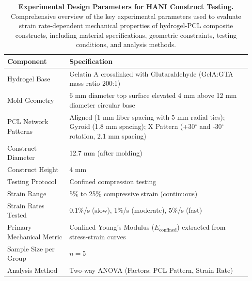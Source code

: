 \begin{table}[H]
\centering
\caption{\textbf{Experimental Design Parameters for HANI Construct Testing.} Comprehensive overview of the key experimental parameters used to evaluate strain rate-dependent mechanical properties of hydrogel-PCL composite constructs, including material specifications, geometric constraints, testing conditions, and analysis methods.}
\label{tab:test_design}
\begin{tabular}{|p{4cm}|p{10cm}|}
\hline
\textbf{Component} & \textbf{Specification} \\ \hline
Hydrogel Base & Gelatin A crosslinked with Glutaraldehyde (GelA:GTA mass ratio 200:1) \\ \hline
Mold Geometry & 6 mm diameter top surface elevated 4 mm above 12 mm diameter circular base \\ \hline
PCL Network Patterns & Aligned (1 mm fiber spacing with 5 mm radial ties); Gyroid (1.8 mm spacing); X Pattern (+30$^\circ$ and -30$^\circ$ rotation, 2.1 mm spacing) \\ \hline
Construct Diameter & 12.7 mm (after molding) \\ \hline
Construct Height & 4 mm \\ \hline
Testing Protocol & Confined compression testing \\ \hline
Strain Range & 5\% to 25\% compressive strain (continuous) \\ \hline
Strain Rates Tested & 0.1\%/s (slow), 1\%/s (moderate), 5\%/s (fast) \\ \hline
Primary Mechanical Metric & Confined Young's Modulus ($E_{\text{confined}}$) extracted from stress-strain curves \\ \hline
Sample Size per Group & \(n = 5\) \\ \hline
Analysis Method & Two-way ANOVA (Factors: PCL Pattern, Strain Rate) \\ \hline
\end{tabular}
\end{table}

